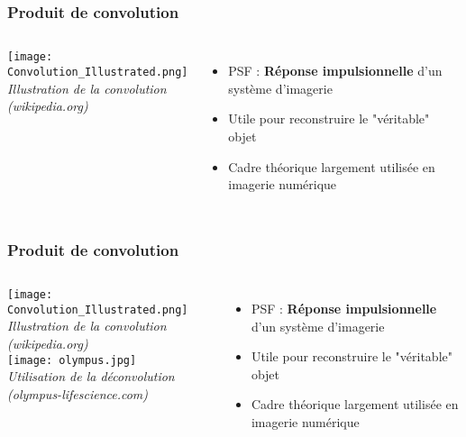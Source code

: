 \documentclass{beamer}
\begin{document}
\begin{frame}
\frametitle{Produit de convolution}
\begin{columns}
\column{60mm}
\texttt{[image: Convolution\_Illustrated.png]}\\
\footnotesize{\textit{Illustration de la convolution (wikipedia.org)}}
\column{60mm}
\begin{itemize}
\item PSF : \textbf{Réponse impulsionnelle} d'un système d'imagerie 
\vspace{0.3cm}
\item Utile pour reconstruire le "véritable" objet
\vspace{0.3cm}
\item Cadre théorique largement utilisée en imagerie numérique
\end{itemize}
\end{columns}
\end{frame}

\begin{frame}
\frametitle{Produit de convolution}
\begin{columns}
\column{60mm}
\texttt{[image: Convolution\_Illustrated.png]}\\
\footnotesize{\textit{Illustration de la convolution (wikipedia.org)}}\\
\vspace{0.2cm}
\texttt{[image: olympus.jpg]}\\
\footnotesize{\textit{Utilisation de la déconvolution (olympus-lifescience.com)}}\\
\column{60mm}
\begin{itemize}
\item PSF : \textbf{Réponse impulsionnelle} d'un système d'imagerie 
\vspace{0.3cm}
\item Utile pour reconstruire le "véritable" objet
\vspace{0.3cm}
\item Cadre théorique largement utilisée en imagerie numérique
\end{itemize}
\end{columns}
\end{frame}
\end{document}
